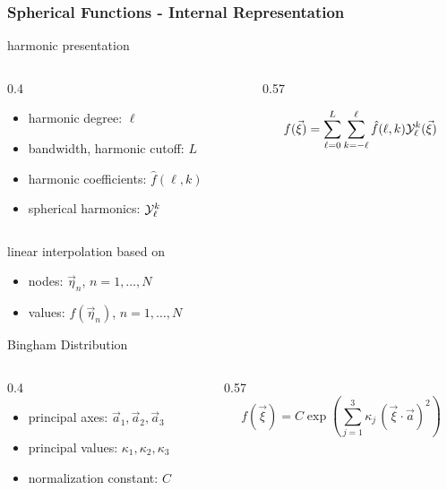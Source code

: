 \documentclass[compress,aspectratio=1610,fleqn]{beamer}
\begin{document}
\begin{frame}
  \frametitle{Spherical Functions - Internal Representation}

   harmonic presentation
  \begin{columns}
    \begin{column}{0.4\textwidth}
      \begin{itemize}
      \item harmonic degree: $\ell$
      \item bandwidth, harmonic cutoff: $L$
      \item harmonic coefficients: $\hat f(\ell,k)$
      \item spherical harmonics: $\mathcal Y_{\ell}^{k}$
      \end{itemize}
    \end{column}
    \begin{column}{0.57\textwidth}

      \begin{equation*}
        f(\vec \xi)
        = \sum_{\ell=0}^{L} \sum_{k=-\ell}^{\ell} \hat f(\ell,k) \mathcal Y_{\ell}^{k}(\vec
        \xi)
      \end{equation*}
          \end{column}

  \end{columns}

  \pause
  \bigskip

   linear interpolation based on
  \begin{itemize}
  \item nodes: $\vec \eta_{n}$, $n=1,\ldots,N$
  \item values: $f(\vec \eta_{n})$, $n=1,\ldots,N$
  \end{itemize}

  \pause
  \bigskip

   Bingham Distribution
  \begin{columns}
    \begin{column}{0.4\textwidth}
      \begin{itemize}
    \item principal axes: $\vec a_{1}, \vec a_{2}, \vec a_{3}$
    \item principal values: $\kappa_{1}, \kappa_{2}, \kappa_{3}$
    \item normalization constant: $C$
    \end{itemize}
  \end{column}
    \begin{column}{0.57\textwidth}
      \begin{equation*}
        f(\vec \xi) = C \exp\left(\sum_{j=1}^{3} \kappa_{j} \, (\vec \xi \cdot \vec a)^{2}\right)
      \end{equation*}
    \end{column}
    \end{columns}

\end{frame}
\end{document}
